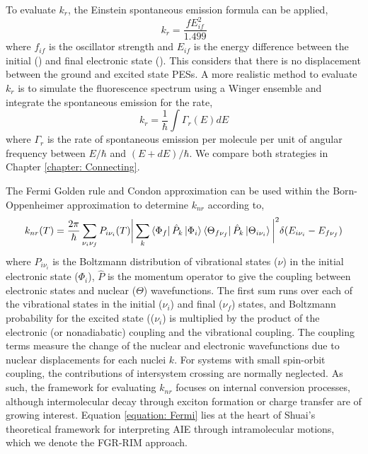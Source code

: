 To evaluate $k_{r}$, the Einstein spontaneous emission formula can be applied,\cite{Yui2005}
\begin{equation}\label{equation: Einstein_rate}
    k_{r}=\frac{fE_{if}^{2}}{1.499}
\end{equation}
where $f_{if}$ is the oscillator strength and $E_{if}$ is the energy difference between the initial (\sone{}) and final electronic state (\szero{}). This considers that there is no displacement between the ground and excited state \acp{PES}. A more realistic method to evaluate $k_{r}$ is to simulate the fluorescence spectrum using a Winger ensemble and integrate the spontaneous emission for the rate,
\begin{equation}\label{equation: integrated_emission_rate}
    k_{r}=\frac{1}{\hbar}\int{\Gamma_{r}(E)dE}
\end{equation}
where $\Gamma_{r}$ is the rate of spontaneous emission per molecule per unit of angular frequency between $E/\hbar$ and $(E+d
E)/\hbar$.\cite{Niu2010,Crespo-Otero2012}
We compare both strategies in Chapter \ref{chapter: Connecting}.  

The Fermi Golden rule and Condon approximation can be used within the Born-Oppenheimer approximation to determine $k_{nr}$ according to,
\begin{equation}\label{equation: Fermi}
    k_{nr}(T)=\frac{2\pi}{\hbar}\sum_{\nu_{i}\nu_{f}}P_{i\nu_{i}}(T)\bigg|\sum_{k}\bra{\Phi_{f}}\hat{P}_{k}\ket{\Phi_{i}}\bra{\Theta_{f\nu_{f}}}\hat{P}_{k}\ket{\Theta_{i\nu_{i}}}\bigg|^{2}\delta{}(E_{i\nu_{i}}-E_{f\nu_{f}})
\end{equation}
where $P_{i\nu_{i}}$ is the Boltzmann distribution of vibrational states ($\nu$) in the initial electronic state ($\Phi_{i}$), $\hat{P}$ is the momentum operator to give the coupling between electronic states and nuclear ($\Theta$) wavefunctions. The first sum runs over each of the vibrational states in the initial ($\nu_{i}$) and final ($\nu_{f}$)  states, and Boltzmann probability for the excited state (($\nu_{i}$) is multiplied by the product of the electronic (or nonadiabatic) coupling and the vibrational coupling. The coupling terms measure the change of the nuclear and electronic wavefunctions due to nuclear displacements for each nuclei $k$. For systems with small spin-orbit coupling, the contributions of intersystem crossing are normally neglected. As such, the framework for evaluating $k_{nr}$ focuses on internal conversion processes, although intermolecular decay through exciton formation or charge transfer are of growing interest.\cite{Li2017} Equation \ref{equation: Fermi} lies at the heart of Shuai's theoretical framework for interpreting AIE through intramolecular motions, which we denote the \ac{FGR-RIM} approach.

